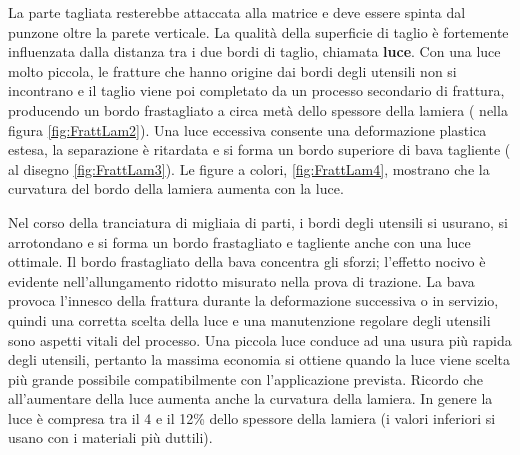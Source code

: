 La parte tagliata resterebbe attaccata alla matrice e deve essere spinta dal punzone oltre la parete verticale.
La qualità della superficie di taglio è fortemente influenzata dalla distanza tra i due bordi di taglio, chiamata \textbf{luce}. Con una luce molto piccola, le fratture che hanno origine dai bordi degli utensili non si incontrano e il taglio viene poi completato da un processo secondario di frattura, producendo un bordo frastagliato a circa metà dello spessore della lamiera ( nella figura \ref{fig:FrattLam2}).
Una luce eccessiva consente una deformazione plastica estesa, la separazione è ritardata e si forma un bordo superiore di bava tagliente ( al disegno \ref{fig:FrattLam3}).
Le figure a colori, \ref{fig:FrattLam4}, mostrano che la curvatura del bordo della lamiera aumenta con la luce.

Nel corso della tranciatura di migliaia di parti, i bordi degli utensili si usurano, si arrotondano e si forma un bordo frastagliato e tagliente anche con una luce ottimale.
Il bordo frastagliato della bava concentra gli sforzi; l'effetto nocivo è evidente nell'allungamento ridotto misurato nella prova di trazione.
La bava provoca l'innesco della frattura durante la deformazione successiva o in servizio, quindi una corretta scelta della luce e una manutenzione regolare degli utensili sono aspetti vitali del processo.
Una piccola luce conduce ad una usura più rapida degli utensili, pertanto la massima economia si ottiene quando la luce viene scelta più grande possibile compatibilmente con l'applicazione prevista. Ricordo che all'aumentare della luce aumenta anche la curvatura della lamiera.
In genere la luce è compresa tra il 4 e il 12\% dello spessore della lamiera (i valori inferiori si usano con i materiali più duttili).


